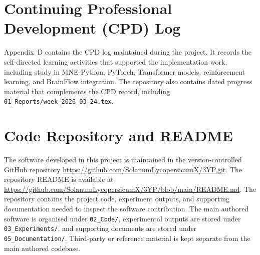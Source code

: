 \documentclass[12pt, a4paper]{article}
\begin{document}
\section{Continuing Professional Development (CPD) Log}

Appendix~D contains the CPD log maintained during the project. It records the self-directed learning activities that supported the implementation work, including study in MNE-Python, PyTorch, Transformer models, reinforcement learning, and BrainFlow integration. The repository also contains dated progress material that complements the CPD record, including \texttt{01\_Reports/week\_2026\_03\_24.tex}.

\section{Code Repository and README}

The software developed in this project is maintained in the version-controlled GitHub repository \url{https://github.com/SolanumLycopersicumX/3YP.git}. The repository README is available at \url{https://github.com/SolanumLycopersicumX/3YP/blob/main/README.md}. The repository contains the project code, experiment outputs, and supporting documentation needed to inspect the software contribution. The main authored software is organised under \texttt{02\_Code/}, experimental outputs are stored under \texttt{03\_Experiments/}, and supporting documents are stored under \texttt{05\_Documentation/}. Third-party or reference material is kept separate from the main authored codebase.
\end{document}
